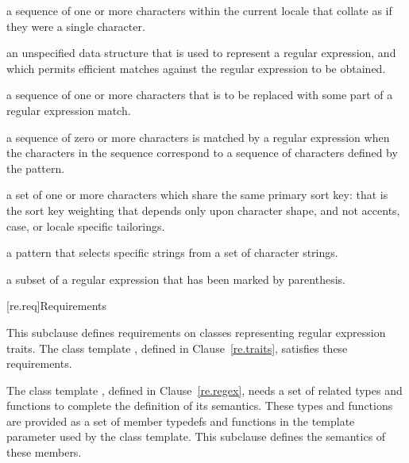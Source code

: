 %
%
a sequence of one or more characters within the
current locale that collate as if they were a single character.

%
an unspecified data structure that is used to
represent a regular expression, and which permits efficient matches
against the regular expression to be obtained.

%
a sequence of one or more characters that is to be
replaced with some part of a regular expression match.

%
%
a sequence of zero or more characters is matched by 
a regular expression when the characters in the sequence
correspond to a sequence of characters defined by the pattern.

% 
%
a set of one or more characters which
share the same primary sort key: that is the sort key weighting that
depends only upon character shape, and not accents, case, or
locale specific tailorings.

a pattern that selects specific strings
from a set of character strings.

%
a subset of a regular expression that has
been marked by parenthesis.

[re.req]{Requirements}

\pnum
This subclause defines requirements on classes representing regular
expression traits.  \enternote The class template
, defined in Clause~\ref{re.traits},
satisfies these requirements.  \exitnote

\pnum
The class template , defined in
Clause~\ref{re.regex}, needs a set of related types and
functions to complete the definition of its semantics. These types
and functions are provided as a set of member typedefs and functions
in the template parameter  used by the  class
template. This subclause defines the semantics of these
members.

